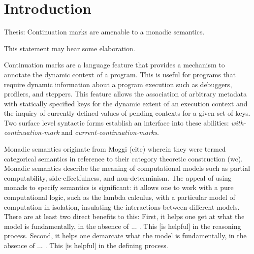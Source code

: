 \documentclass[ms]{byuprop}
\title{\Title}
\author{\Author}
\begin{document}
\maketitle



\section{Introduction}


Thesis: Continuation marks are amenable to a monadic semantics.

This statement may bear some elaboration. 

Continuation marks are a language feature that provides a mechanism to annotate 
the dynamic context of a program. This is useful for programs that 
require dynamic information about a program execution such as 
debuggers, profilers, and steppers.
This feature allows the association of 
arbitrary metadata with statically specified keys for the dynamic extent of an 
execution context and the inquiry of currently defined values of pending 
contexts for a given set of keys. Two surface level syntactic forms establish 
an interface into these abilities: \emph{with-continuation-mark} and \emph{current-continuation-marks}.

Monadic semantics originate from Moggi (cite) wherein they were termed categorical semantics in reference to their category theoretic construction (wc). Monadic semantics describe the meaning of computational models such as partial computability, side-effectfulness, and non-determinism. The appeal of using monads to specify semantics is significant: it allows one to work with a pure computational logic, such as the lambda calculus, with a particular model of computation in isolation, insulating the interactions between different models. There are at least two direct benefits to this: First, it helps one get at what the model is fundamentally, in the absence of ... . This [is helpful] in the reasoning process. Second, it helps one demarcate what the model is fundamentally, in the absence of ... . This [is helpful] in the defining process.
\end{document}
